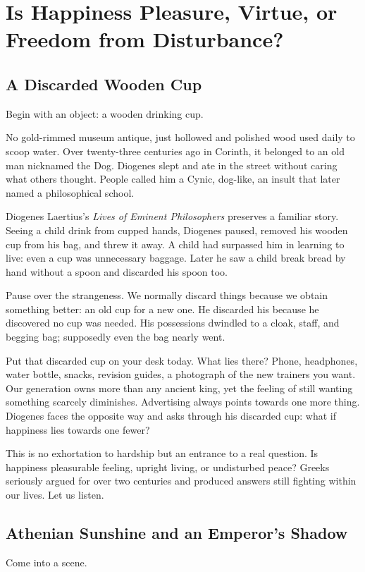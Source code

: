 \chapter[Pleasure, Virtue, or Tranquillity?]{Is Happiness Pleasure, Virtue, or Freedom from Disturbance?}
\section{A Discarded Wooden Cup}
Begin with an object: a wooden drinking cup.

No gold-rimmed museum antique, just hollowed and polished wood used daily to scoop water. Over twenty-three centuries ago in Corinth, it belonged to an old man nicknamed the Dog. Diogenes slept and ate in the street without caring what others thought. People called him a Cynic, dog-like, an insult that later named a philosophical school.

Diogenes Laertius's \textit{Lives of Eminent Philosophers} preserves a familiar story. Seeing a child drink from cupped hands, Diogenes paused, removed his wooden cup from his bag, and threw it away. A child had surpassed him in learning to live: even a cup was unnecessary baggage. Later he saw a child break bread by hand without a spoon and discarded his spoon too.

Pause over the strangeness. We normally discard things because we obtain something better: an old cup for a new one. He discarded his because he discovered no cup was needed. His possessions dwindled to a cloak, staff, and begging bag; supposedly even the bag nearly went.

Put that discarded cup on your desk today. What lies there? Phone, headphones, water bottle, snacks, revision guides, a photograph of the new trainers you want. Our generation owns more than any ancient king, yet the feeling of still wanting something scarcely diminishes. Advertising always points towards one more thing. Diogenes faces the opposite way and asks through his discarded cup: what if happiness lies towards one fewer?

This is no exhortation to hardship but an entrance to a real question. Is happiness pleasurable feeling, upright living, or undisturbed peace? Greeks seriously argued for over two centuries and produced answers still fighting within our lives. Let us listen.

\section{Athenian Sunshine and an Emperor's Shadow}
Come into a scene.

